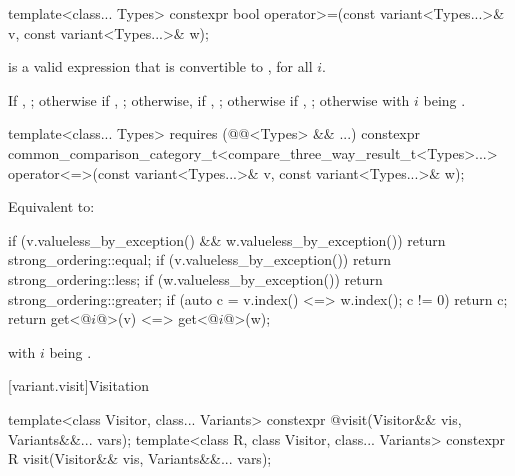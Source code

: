 %
\begin{itemdecl}
template<class... Types>
  constexpr bool operator>=(const variant<Types...>& v, const variant<Types...>& w);
\end{itemdecl}

\begin{itemdescr}
\pnum
\mandates
{} is a valid expression that is
convertible to , for all $i$.

\pnum
\returns
If , ;
otherwise if , ;
otherwise, if , ;
otherwise if , ;
otherwise  with $i$ being .
\end{itemdescr}

%
\begin{itemdecl}
template<class... Types> requires (@@<Types> && ...)
  constexpr common_comparison_category_t<compare_three_way_result_t<Types>...>
    operator<=>(const variant<Types...>& v, const variant<Types...>& w);
\end{itemdecl}

\begin{itemdescr}
\pnum
\effects
Equivalent to:
\begin{codeblock}
if (v.valueless_by_exception() && w.valueless_by_exception())
  return strong_ordering::equal;
if (v.valueless_by_exception()) return strong_ordering::less;
if (w.valueless_by_exception()) return strong_ordering::greater;
if (auto c = v.index() <=> w.index(); c != 0) return c;
return get<@$i$@>(v) <=> get<@$i$@>(w);
\end{codeblock}
with $i$ being .
\end{itemdescr}

[variant.visit]{Visitation}

%
%
\begin{itemdecl}
template<class Visitor, class... Variants>
  constexpr @\seebelow@ visit(Visitor&& vis, Variants&&... vars);
template<class R, class Visitor, class... Variants>
  constexpr R visit(Visitor&& vis, Variants&&... vars);
\end{itemdecl}

